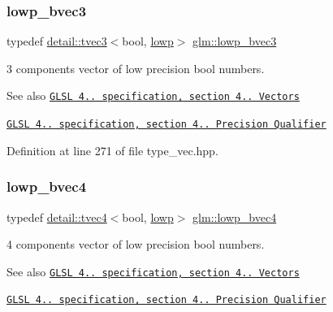 \subsubsection{\texorpdfstring{lowp\+\_\+bvec3}{lowp\_bvec3}}
{\footnotesize\ttfamily typedef \hyperlink{structglm_1_1detail_1_1tvec3}{detail\+::tvec3}$<$bool, \hyperlink{namespaceglm_a0f04f086094c747d227af4425893f545ae161af3fc695e696ce3bf69f7332bc2d}{lowp}$>$ \hyperlink{group__core__precision_ga17ac2986f7b315a2ac4ee2662b5be9cb}{glm\+::lowp\+\_\+bvec3}}

3 components vector of low precision bool numbers.

\begin{DoxySeeAlso}{See also}
\href{http://www.opengl.org/registry/doc/GLSLangSpec.4.20.8.pdf}{\tt G\+L\+SL 4.. specification, section 4.. Vectors} 

\href{http://www.opengl.org/registry/doc/GLSLangSpec.4.20.8.pdf}{\tt G\+L\+SL 4.. specification, section 4.. Precision Qualifier} 
\end{DoxySeeAlso}


Definition at line 271 of file type\+\_\+vec.\+hpp.

\mbox{\label{group__core__precision_ga24c651dc8cb20779b3773428aef4f7f4}} 
\subsubsection{\texorpdfstring{lowp\+\_\+bvec4}{lowp\_bvec4}}
{\footnotesize\ttfamily typedef \hyperlink{structglm_1_1detail_1_1tvec4}{detail\+::tvec4}$<$bool, \hyperlink{namespaceglm_a0f04f086094c747d227af4425893f545ae161af3fc695e696ce3bf69f7332bc2d}{lowp}$>$ \hyperlink{group__core__precision_ga24c651dc8cb20779b3773428aef4f7f4}{glm\+::lowp\+\_\+bvec4}}

4 components vector of low precision bool numbers.

\begin{DoxySeeAlso}{See also}
\href{http://www.opengl.org/registry/doc/GLSLangSpec.4.20.8.pdf}{\tt G\+L\+SL 4.. specification, section 4.. Vectors} 

\href{http://www.opengl.org/registry/doc/GLSLangSpec.4.20.8.pdf}{\tt G\+L\+SL 4.. specification, section 4.. Precision Qualifier} 
\end{DoxySeeAlso}


